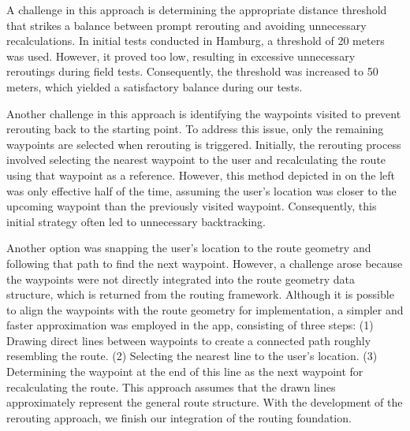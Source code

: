 A challenge in this approach is determining the appropriate distance threshold that strikes a balance between prompt rerouting and avoiding unnecessary recalculations. In initial tests conducted in Hamburg, a threshold of 20 meters was used. However, it proved too low, resulting in excessive unnecessary reroutings during field tests. Consequently, the threshold was increased to 50 meters, which yielded a satisfactory balance during our tests.

Another challenge in this approach is identifying the waypoints visited to prevent rerouting back to the starting point. To address this issue, only the remaining waypoints are selected when rerouting is triggered. Initially, the rerouting process involved selecting the nearest waypoint to the user and recalculating the route using that waypoint as a reference. However, this method depicted in  on the left was only effective half of the time, assuming the user's location was closer to the upcoming waypoint than the previously visited waypoint. Consequently, this initial strategy often led to unnecessary backtracking.

Another option was snapping the user's location to the route geometry and following that path to find the next waypoint. However, a challenge arose because the waypoints were not directly integrated into the route geometry data structure, which is returned from the routing framework. Although it is possible to align the waypoints with the route geometry for implementation, a simpler and faster approximation was employed in the app, consisting of three steps: (1) Drawing direct lines between waypoints to create a connected path roughly resembling the route. (2) Selecting the nearest line to the user's location. (3) Determining the waypoint at the end of this line as the next waypoint for recalculating the route. This approach assumes that the drawn lines approximately represent the general route structure. With the development of the rerouting approach, we finish our integration of the routing foundation.

